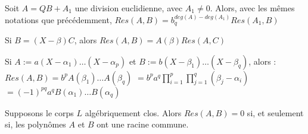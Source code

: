 \begin{prop}
Soit $A=QB+A_1$ une division euclidienne, avec $A_1 \neq 0$. Alors, avec les m\^emes notations que pr\'ec\'edemment, $Res(A,B)=b_q^{deg(A)-deg(A_1)} Res(A_1,B)$
\end{prop}
\begin{Lemme}
Si $B=(X-\beta)C$, alors $Res(A,B)=A(\beta)Res(A,C)$
\end{Lemme}
\begin{Thm}
Si $A:=a(X-\alpha_1)\ldots (X-\alpha_p)$ et $B:=b(X-\beta_1)\ldots(X-\beta_q)$, alors :\\
$Res(A,B)=b^pA(\beta_1)\ldots A(\beta_q)$
$=b^pa^q \prod_{i=1}^p \prod_{j=1}^q (\beta_j-\alpha_i)$
$=(-1)^{pq} a^q B(\alpha_1) \ldots B(\alpha_q)$
\end{Thm}
\begin{cor}
Supposons le corps $L$ alg\'ebriquement clos. Alors $Res(A,B)=0$ si, et seulement si, les polyn\^omes $A$ et $B$ ont une racine commune.
\end{cor}

